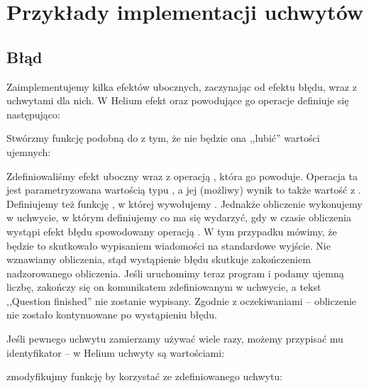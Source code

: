 \section{Przykłady implementacji uchwytów}


\subsection{Błąd}

Zaimplementujemy kilka efektów ubocznych, zaczynając od efektu błędu, wraz z uchwytami dla nich. W Helium efekt oraz powodujące go operacje definiuje się następująco:



Stwórzmy funkcję podobną do  z tym, że nie będzie ona ,,lubić'' wartości ujemnych:



Zdefiniowaliśmy efekt uboczny  wraz z operacją , która go powoduje. Operacja ta jest parametryzowana wartością typu , a jej (możliwy) wynik to także wartość z . Definiujemy też funkcję , w której wywołujemy . Jednakże obliczenie wykonujemy w uchwycie, w którym definiujemy co ma się wydarzyć, gdy w czasie obliczenia wystąpi efekt błędu spowodowany operacją . W tym przypadku mówimy, że będzie to skutkowało wypisaniem wiadomości na standardowe wyjście. Nie wznawiamy obliczenia, stąd wystąpienie błędu skutkuje zakończeniem nadzorowanego obliczenia. Jeśli uruchomimy teraz program i podamy ujemną liczbę, zakończy się on komunikatem zdefiniowanym w uchwycie, a tekst ,,Question finished'' nie zostanie wypisany. Zgodnie z oczekiwaniami -- obliczenie  nie zostało kontynuowane po wystąpieniu błędu.

Jeśli pewnego uchwytu zamierzamy używać wiele razy, możemy przypisać mu identyfikator -- w Helium uchwyty są wartościami:



zmodyfikujmy funkcję  by korzystać ze zdefiniowanego uchwytu:



